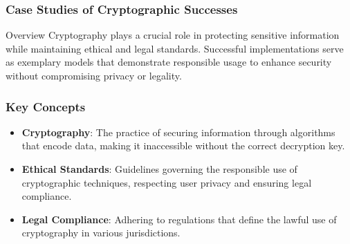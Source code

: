 \documentclass{beamer}
\begin{document}
\begin{frame}[fragile]
    \frametitle{Case Studies of Cryptographic Successes}
    \begin{block}{Overview}
        Cryptography plays a crucial role in protecting sensitive information while maintaining ethical and legal standards.
        Successful implementations serve as exemplary models that demonstrate responsible usage to enhance security without compromising privacy or legality.
    \end{block}
\end{frame}

\begin{frame}[fragile]
    \frametitle{Key Concepts}
    \begin{itemize}
        \item \textbf{Cryptography}: The practice of securing information through algorithms that encode data, making it inaccessible without the correct decryption key.
        \item \textbf{Ethical Standards}: Guidelines governing the responsible use of cryptographic techniques, respecting user privacy and ensuring legal compliance.
        \item \textbf{Legal Compliance}: Adhering to regulations that define the lawful use of cryptography in various jurisdictions.
    \end{itemize}
\end{frame}
\end{document}
